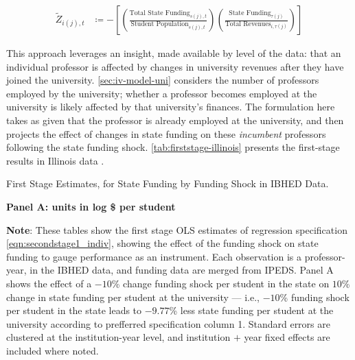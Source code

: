 \begin{align}
    \label{eqn:rolling-instrument}
    \tilde Z_{i(j),t} &\coloneqq - \left[
    \left( \frac{\text{Total State Funding}_{s(j),t}}{\text{Student Population}_{s(j),t}} \right)
    \left( \frac{\text{State Funding}_{\tau(j)}}{\text{Total Revenues}_{i,\tau(j)}} \right) \right]
\end{align}

This approach leverages an insight, made available by level of the data: that an individual professor is affected by changes in university revenues after they have joined the university.
\autoref{sec:iv-model-uni} considers the number of professors employed by the university; whether a professor becomes employed at the university is likely affected by that university's finances.
The formulation here takes as given that the professor is already employed at the university, and then projects the effect of changes in state funding on these \textit{incumbent} professors following the state funding shock.
\autoref{tab:firststage-illinois} presents the first-stage results in Illinois data .

\begin{table}[h!]
    \singlespacing
    \centering
    \caption{First Stage Estimates, for State Funding by Funding Shock in IBHED Data.}
    
    \textbf{Panel A: units in log \$ per student}
    
    \makebox[\textwidth][c]{}
    
    \label{tab:firststage-illinois}
    \justify
    \footnotesize
    \textbf{Note}:
    These tables show the first stage OLS estimates of regression specification \eqref{eqn:secondstage1_indiv}, showing the effect of the funding shock on state funding to gauge performance as an instrument.
    Each observation is a professor-year, in the IBHED data, and funding data are merged from IPEDS.
    Panel A shows the effect of a $-10$\% change funding shock per student in the state on $10$\% change in state funding per student at the university --- i.e.,
    $-10$\% funding shock per student in the state leads to $-9.77$\% less state funding per student at the university according to prefferred specification column 1.        
    Standard errors are clustered at the institution-year level, and institution $+$ year fixed effects are included where noted.
\end{table}


